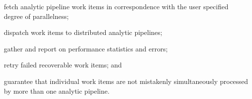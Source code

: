 % 
% 
% 
% 
\begin{description}
  \item fetch analytic pipeline work items in correspondence with the user specified degree of parallelness;
  \item dispatch work items to distributed analytic pipelines;
  \item gather and report on performance statistics and errors;
  \item retry failed recoverable work items; and
  \item guarantee that individual work items are not mistakenly simultaneously processed by more than one analytic pipeline.
\end{description}